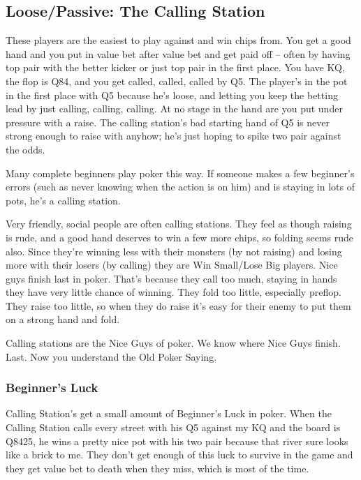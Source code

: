 \subsection{Loose/Passive: The Calling Station}

These players are the easiest to play against and win chips from.
You get a good hand and you put in value bet after value bet and
get paid off -- often by having top pair with the better kicker or
just top pair in the first place. You have KQ, the flop is Q84, and
you get called, called, called by Q5. The player's in the pot in the
first place with Q5 because he's loose, and letting you keep the
betting lead by just calling, calling, calling. At no stage in
the hand are you put under pressure with a raise. The calling
station's bad starting hand of Q5 is never strong enough to raise with
anyhow; he's just hoping to spike two pair against the odds.

Many complete beginners play poker this way. If someone makes
a few beginner's errors (such as never knowing when the action
is on him) and is staying in lots of pots, he's a calling station.

Very friendly, social people are often calling stations.
They feel as though raising is rude, and a good hand deserves
to win a few more chips, so folding seems rude also. Since
they're winning less with their monsters (by not raising)
and losing more with their losers (by calling) they are
Win Small/Lose Big players. Nice guys
finish last in poker. That's because they call too much, staying
in hands they have very little chance of winning. They fold
too little, especially preflop. They raise too little, so when
they do raise it's easy for their enemy to put them on a strong hand
and fold.

Calling stations are the Nice Guys of poker. We know where Nice Guys
finish. Last. Now you understand the Old Poker Saying.

\subsubsection{Beginner's Luck}

Calling Station's get a small amount of Beginner's Luck in poker.
When the Calling Station calls every street with his Q5 against my KQ
and the board is Q8425, he wins a pretty nice pot with his two pair
because that river sure looks like a brick to me. They don't get
enough of this luck to survive in the game and they get value bet to
death when they miss, which is most of the time.


